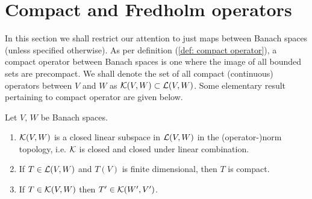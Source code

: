 \documentclass[12pt]{article}
\begin{document}
%    
%    

\section{Compact and Fredholm operators}
    
In this section we shall restrict our attention to just maps between Banach spaces (unless specified otherwise). As per definition (\ref{def: compact operator}), a compact operator between Banach spaces is one where the image of all bounded sets are precompact. We shall denote the set of all compact (continuous) operators between $V$ and $W$ as ${\cal{K}}(V, W) \subset {\cal{L}}(V, W)$. Some elementary result pertaining to compact operator are given below. 


\begin{flemma} Let $V$, $W$ be Banach spaces. 
    \begin{enumerate}
        \item ${\cal{K}}(V, W)$ is a closed linear subspace in ${\cal{L}}(V, W)$ in the (operator-)norm topology, i.e. ${\cal{K}}$ is closed and closed under linear combination. 
        \item If $T \in {\cal{L}}(V, W)$ and $T(V)$ is finite dimensional, then $T$ is compact. 
        \item If $T \in {\cal{K}}(V, W)$ then $T' \in {\cal{K}}(W', V')$. 
    \end{enumerate}
\end{flemma}
\end{document}
